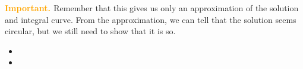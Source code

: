 \begin{example}
\textbf{\textcolor{orange}{Important. }} Remember that this gives us only an approximation of the solution and integral curve. From the approximation, we can tell that the solution seems circular, but we still need to show that it is so.

\end{example}





%



\begin{video}
\begin{itemize}
	\item {}
	\item {}
\end{itemize}	
\end{video}


